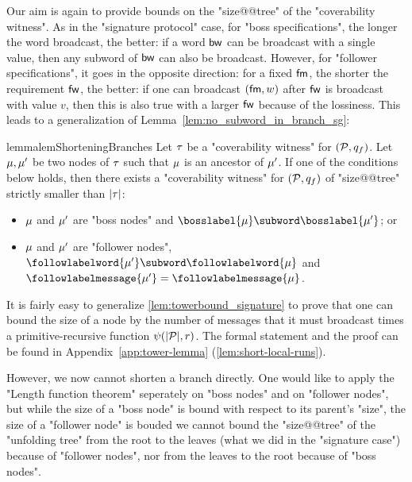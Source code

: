 Our aim is again to provide bounds on the "size@@tree" of the "coverability witness". 
As in the "signature protocol" case, for "boss specifications", the longer the word broadcast, the better: if a word $\mathsf{bw}$ can be broadcast with a single value, then any subword of $\mathsf{bw}$ can also be broadcast. 
However, for "follower specifications", it goes in the opposite direction: for a fixed $\mathsf{fm}$, the shorter the requirement $\mathsf{fw}$, the better: if one can broadcast $(\mathsf{fm},w)$ after $\mathsf{fw}$ is broadcast with value $v$, then this is also true with a larger $\mathsf{fw}$ because of the lossiness. This leads to a generalization of Lemma~\ref{lem:no_subword_in_branch_sg}:

\begin{restatable}{lemma}{lemShorteningBranches} 
\label{lem:shortening-branches}
	Let $\tau$ be a "coverability witness" for $(\mathcal{P}, q_f)$.
	Let $\mu, \mu'$ be two nodes of $\tau$ such that $\mu$ is an ancestor of $\mu'$. If one of the conditions below holds, then there exists a "coverability witness" for $(\mathcal{P}, q_f)$ of "size@@tree" strictly smaller than $|\tau|$:
	\begin{itemize}
	\item $\mu$ and $\mu'$ are "boss nodes" and $\bosslabel{\node} \subword \bosslabel{\node'}$; or
	\item $\mu$ and $\mu'$ are "follower nodes", $\followlabelword{\node'} \subword \followlabelword{\node}$ and $\followlabelmessage{\node'}=\followlabelmessage{\node}$.
	\end{itemize} 
\end{restatable}

It is fairly easy to generalize \cref{lem:towerbound_signature} to prove that one can bound the size of a node by the number of messages that it must broadcast times a primitive-recursive function $\psi(|\mathcal{P}|,r)$. The formal statement and the proof can be found in Appendix~\ref{app:tower-lemma} (\cref{lem:short-local-runs}). 

However, we now cannot shorten a branch directly. One would like to apply the "Length function theorem" seperately on "boss nodes" and on "follower nodes", but while the size of a "boss node" is bound with respect to its parent's "size", the size of a "follower node" is bouded  we cannot bound the "size@@tree" of the "unfolding tree" from the root to the leaves (what we did in the "signature case") because of "follower nodes", nor from the leaves to the root because of "boss nodes". 

